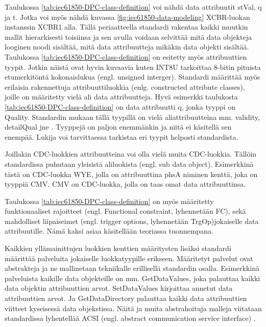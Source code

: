 Taulukossa \ref{tab:iec61850-DPC-class-definition} voi nähdä data attribuutit stVal, q ja t. Jotka voi myös nähdä kuvassa \ref{fig:iec61850-data-modeling} XCBR-luokan instanssin XCBR1 alla. Tällä periaatteella standardi rakentaa kaikki muutkin mallit hierarkisesti toisiinsa ja sen avulla voidaan selvittää mitä data objekteja looginen noodi sisältää, mitä data attribuutteja mikäkin data objekti sisältää. Taulukossa \ref{tab:iec61850-DPC-class-definition} on esitetty myös attribuuttien tyypit. Jotkin näistä ovat hyvin kuvaavia kuten INT8U tarkoittaa 8-bitin pituista etumerkitöntä kokonaislukua (engl. unsigned interger). Standardi määrittää myös erilaisia rakennettuja attribuuttiluokkia (enlg. constructed attribute classes), joille on määritetty vielä ali data attribuutteja. Hyvä esimerkki taulukosta \ref{tab:iec61850-DPC-class-definition} on data attribuutti q, jonka tyyppi on Quality. Standardin mukaan tällä tyypillä on vielä aliattribuutteina mm. validity, detailQual jne \cite[s.~11]{IEC61850-7-3}. Tyyppejä on paljon enemmänkin ja niitä ei käsitellä sen enempää. Lukija voi tarvittaessa tarkistaa eri tyypit helposti standardista.

Joillakin CDC-luokkien attribuutteina voi olla vielä muita CDC-luokkia. Tällöin standardissa puhutaan yleisistä aliluokista (engl. sub data object). Esimerkkinä tästä on CDC-luokka WYE, jolla on attribuuttina phsA niminen kenttä, joka on tyyppiä CMV. CMV on CDC-luokka, jolla on taas omat data attribuuttinsa. \cite[s.~51,61]{IEC61850-7-2} \cite[s.~36]{IEC61850-7-3}

Taulukossa \ref{tab:iec61850-DPC-class-definition} on myös määritetty funktionaaliset rajoitteet (engl. Functional constraint, lyhennetään FC), sekä mahdolliset liipaiseimet (engl. trigger options, lyhennetään TrgOp)jokaiselle data attribuutille. Nämä kaksi asiaa käsitellään teoriassa tuonnempana.

Kaikkien yllämainittujen luokkien kenttien määritysten lisäksi standardi määrittää palveluita jokaiselle luokkatyypille erikseen. Määritetyt palvelut ovat abstrakteja ja ne mallinetaan tekniikalle erillisellä standardin osalla. Esimerkkinä palveluista kaikille data objekteille on mm. GetDataValues, joka palauttaa kaikki data objektin attribuuttien arvot. SetDataValues kirjoittaa annetut data attribuuttien arvot. Ja GetDataDirectory palauttaa kaikki data attribuuttien viitteet kyseisessä data objekstissa. Näitä ja muita abstrahoituja malleja viitataan standardissa lyhentellää ACSI (engl. abstract communication service interface) \cite[s.~15,45--46]{IEC61850-7-2} \cite[s.~26]{IEC61850-7-1}.


